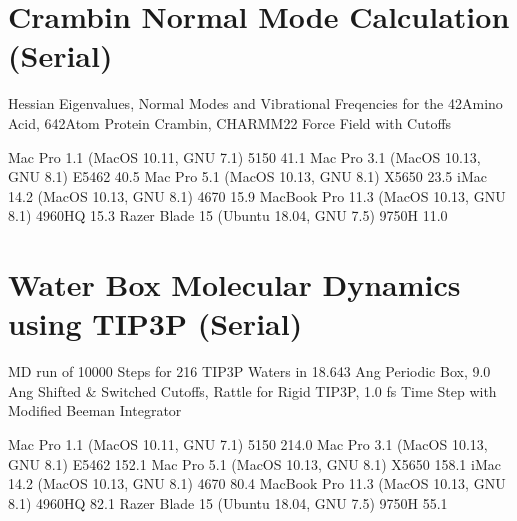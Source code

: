 \documentclass[letterpaper,11pt,english]{sphinxmanual}
\begin{document}
\section{Crambin Normal Mode Calculation (Serial)}
\label{\detokenize{text/benchmarks:crambin-normal-mode-calculation-serial}}
Hessian Eigenvalues, Normal Modes and Vibrational Freqencies for the 42\sphinxhyphen{}Amino Acid, 642\sphinxhyphen{}Atom Protein Crambin, CHARMM\sphinxhyphen{}22 Force Field with Cutoffs


\begin{sphinxVerbatim}[commandchars=\\\{\}]
Mac Pro 1.1 (MacOS 10.11, GNU 7.1)             5150                41.1
Mac Pro 3.1 (MacOS 10.13, GNU 8.1)            E5462                40.5
Mac Pro 5.1 (MacOS 10.13, GNU 8.1)            X5650                23.5
iMac 14.2 (MacOS 10.13, GNU 8.1)               4670                15.9
MacBook Pro 11.3 (MacOS 10.13, GNU 8.1)      4960HQ                15.3
Razer Blade 15 (Ubuntu 18.04, GNU 7.5)        9750H                11.0
\end{sphinxVerbatim}


\section{Water Box Molecular Dynamics using TIP3P (Serial)}
\label{\detokenize{text/benchmarks:water-box-molecular-dynamics-using-tip3p-serial}}
MD run of 10000 Steps for 216 TIP3P Waters in 18.643 Ang Periodic Box, 9.0 Ang Shifted \& Switched Cutoffs, Rattle for Rigid TIP3P, 1.0 fs Time Step with Modified Beeman Integrator


\begin{sphinxVerbatim}[commandchars=\\\{\}]
Mac Pro 1.1 (MacOS 10.11, GNU 7.1)             5150               214.0
Mac Pro 3.1 (MacOS 10.13, GNU 8.1)            E5462               152.1
Mac Pro 5.1 (MacOS 10.13, GNU 8.1)            X5650               158.1
iMac 14.2 (MacOS 10.13, GNU 8.1)               4670                80.4
MacBook Pro 11.3 (MacOS 10.13, GNU 8.1)      4960HQ                82.1
Razer Blade 15 (Ubuntu 18.04, GNU 7.5)        9750H                55.1
\end{sphinxVerbatim}
\end{document}
